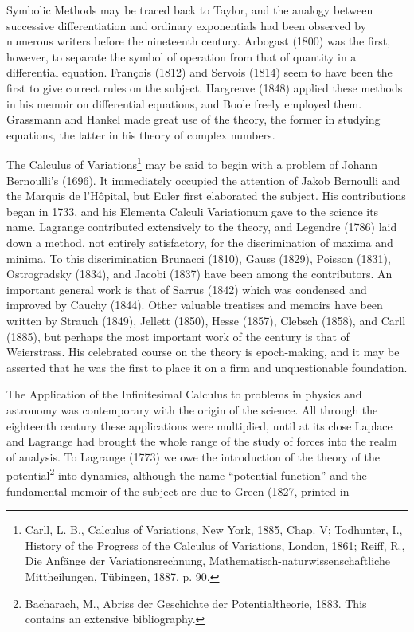 \documentclass[oneside]{book}
\begin{document}
{Symbolic Methods may be traced back to Taylor, and the analogy
between successive differentiation and ordinary exponentials had
been observed by numerous writers before the nineteenth
century. Arbogast (1800) was the first, however, to separate the
symbol of operation from that of quantity in a differential
equation. Fran\c{c}ois (1812) and Servois (1814) seem to have been
the first to give correct rules on the subject. Hargreave (1848)
applied these methods in his memoir on differential equations, and
Boole freely employed them. Grassmann and Hankel made great use of
the theory, the former in studying equations, the latter in his
theory of complex numbers.

The Calculus of Variations\footnote{Carll, L. B., Calculus of
Variations, New York, 1885, Chap. V; Todhunter, I., History of the
Progress of the Calculus of Variations, London, 1861; Reiff, R., Die
Anf\"ange der Variationsrechnung,
Mathematisch-naturwissenschaftliche Mittheilungen, T\"ubingen,
1887, p. 90.} may be said to begin with a problem of Johann
Bernoulli's (1696). It immediately occupied the attention of Jakob
Bernoulli and the Marquis de l'H\^opital, but Euler first elaborated
the subject. His contributions began in 1733, and his Elementa
Calculi Variationum gave to the science its name. Lagrange
contributed extensively to the theory, and Legendre (1786) laid down
a method, not entirely satisfactory, for the discrimination of
maxima and minima. To this discrimination Brunacci (1810), Gauss
(1829), Poisson (1831), Ostrogradsky (1834), and Jacobi (1837) have
been among the contributors. An important general work is that of
Sarrus (1842) which was condensed and improved by Cauchy
(1844). Other valuable treatises and memoirs have been written by
Strauch (1849), Jellett (1850), Hesse (1857), Clebsch (1858), and
Carll (1885), but perhaps the most important work of the century is
that of Weierstrass. His celebrated course on the theory is
epoch-making, and it may be asserted that he was the first to place
it on a firm and unquestionable foundation.

The Application of the Infinitesimal Calculus to problems in physics
and astronomy was contemporary with the origin of the science. All
through the eighteenth century these applications were multiplied,
until at its close Laplace and Lagrange had brought the whole range
of the study of forces into the realm of analysis. To Lagrange
(1773) we owe the introduction of the theory of the
potential\footnote{Bacharach, M., Abriss der Geschichte der
Potentialtheorie, 1883. This contains an extensive bibliography.}
into dynamics, although the name ``potential function'' and the
fundamental memoir of the subject are due to Green (1827, printed in

}
\end{document}
